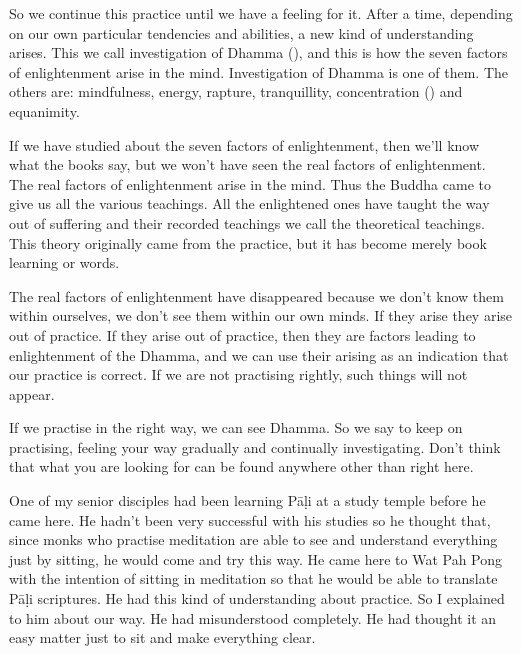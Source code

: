 \vspace*{-0.5\baselineskip}
So we continue this practice until we have a feeling for it. After a time, depending on our own particular tendencies and abilities, a new kind of understanding arises. This we call investigation of Dhamma (), and this is how the seven factors of enlightenment arise in the mind. Investigation of Dhamma is one of them. The others are: mindfulness, energy, rapture, tranquillity, concentration () and equanimity. 

If we have studied about the seven factors of enlightenment, then we'll know what the books say, but we won't have seen the real factors of enlightenment. The real factors of enlightenment arise in the mind. Thus the Buddha came to give us all the various teachings. All the enlightened ones have taught the way out of suffering and their recorded teachings we call the theoretical teachings. This theory originally came from the practice, but it has become merely book learning or words. 

The real factors of enlightenment have disappeared because we don't know them within ourselves, we don't see them within our own minds. If they arise they arise out of practice. If they arise out of practice, then they are factors leading to enlightenment of the Dhamma, and we can use their arising as an indication that our practice is correct. If we are not practising rightly, such things will not appear. 

If we practise in the right way, we can see Dhamma. So we say to keep on practising, feeling your way gradually and continually investigating. Don't think that what you are looking for can be found anywhere other than right here. 

One of my senior disciples had been learning P\=a\d{l}i at a study temple before he came here. He hadn't been very successful with his studies so he thought that, since monks who practise meditation are able to see and understand everything just by sitting, he would come and try this way. He came here to Wat Pah Pong with the intention of sitting in meditation so that he would be able to translate P\=a\d{l}i scriptures. He had this kind of understanding about practice. So I explained to him about our way. He had misunderstood completely. He had thought it an easy matter just to sit and make everything clear. 

